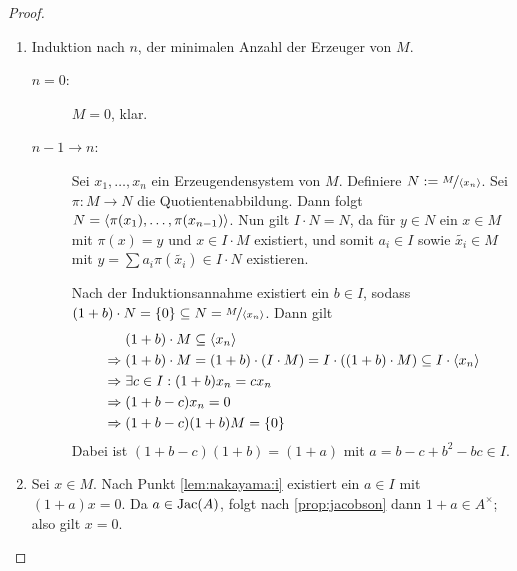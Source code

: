 \documentclass[12pt,a4paper]{scrartcl}
\theoremstyle{cplain}
\theoremstyle{cdef}
\begin{document}
\begin{proof}
	\leavevmode
	\begin{enumerate}[label=\ref{lem:nakayama:\roman*}]
		\item Induktion nach $n$, der minimalen Anzahl der Erzeuger von $M$.
        \begin{description}
            \item[$n = 0$:] $M = 0$, klar.
            \item[$n-1\to n$:] Sei $x_1,\dots, x_n$ ein Erzeugendensystem von $M$. Definiere $N := \nicefrac{M}{\langle x_n\rangle}$. Sei $\pi \colon M\to N$ die Quotientenabbildung. Dann folgt $N = \langle\pi(x_1),\dots,\pi(x_{n-1})\rangle$. Nun gilt $I\cdot N = N$, da für $y\in N$ ein $x\in M$ mit $\pi(x) = y$ und $x\in I\cdot M$ existiert, und somit $a_i\in I$ sowie $\tilde{x_i}\in M$ mit $y =\sum a_i\pi(\tilde{x_i})\in I\cdot N$ existieren.
		
            Nach der Induktionsannahme existiert ein $b\in I$, sodass $(1+b)\cdot N = \{0\}\subseteq N = \nicefrac{M}{\langle x_n\rangle}$. Dann gilt
            \begin{align*}
                &\phantom{{}\Rightarrow{}}(1+b)\cdot M\subseteq \<x_n\>\\
                &\Rightarrow (1+b)\cdot M = (1+b)\cdot (I\cdot M) = I\cdot((1+b)\cdot M)\subseteq I \cdot \<x_n\>\\
                &\Rightarrow \exists c\in I: (1+b) x_n = cx_n \\
                &\Rightarrow (1+b-c)x_n = 0\\
                &\Rightarrow (1+b-c)(1+b)M = \{0\}
            \end{align*}
            Dabei ist $(1+b-c)(1+b) = (1+a)$ mit $a = b-c+b^2-bc\in I$.
        \end{description}
        \item Sei $x\in M$. Nach Punkt \ref{lem:nakayama:i} existiert ein $a\in I$ mit $(1+a)x = 0$. Da $a\in \operatorname{Jac}(A)$, folgt nach \cref{prop:jacobson} dann $1+a\in A^{\times}$; also gilt $x = 0$.
        \qedhere
	\end{enumerate}
\end{proof}

\end{document}
